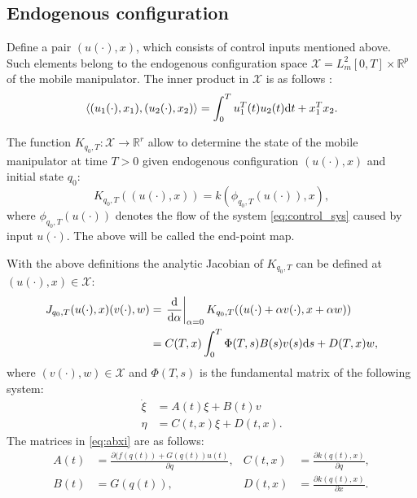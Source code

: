 \subsection{Endogenous configuration}
Define a pair $(u(\cdot), x)$, which consists of control inputs mentioned above.
Such elements belong to the endogenous configuration space
$\mathcal{X} = L_m^2[0, T] \times \mathbb{R}^p$ of the mobile manipulator.
The inner product in $\mathcal{X}$ is as follows \cite{ecs_ijc}:
\begin{equation}
\langle (u_1(\cdot), x_1), (u_2(\cdot), x_2) \rangle = \int_0^T u_1^T(t) u_2(t) \mathrm{d} t + x_1^T x_2.
\end{equation}

The function
$K_{q_0, T}: \mathcal{X} \rightarrow \mathbb{R}^r$
allow to determine the state of the mobile manipulator at time $T>0$ given
endogenous configuration $(u(\cdot), x)$ and initial state $q_0$:
\begin{equation}
K_{q_0, T}((u(\cdot), x)) = k(\phi_{q_0, T}(u(\cdot)), x),
\end{equation}
where $\phi_{q_0, T}(u(\cdot))$ denotes the flow of the system \eqref{eq:control_sys}
caused by input $u(\cdot)$. The above will be called the end-point map.

With the above definitions the analytic Jacobian of $K_{q_0, T}$ can be defined at $(u(\cdot), x) \in \mathcal{X}$:
\begin{align}
\label{eq:jacobian}
J_{q_0, T}(u(\cdot), x)(v(\cdot), w) &= \left.\frac{\mathrm{d}}{\mathrm{d} \alpha}\right|_{\alpha=0} K_{q_0, T}((u(\cdot)+\alpha v(\cdot), x+\alpha w))\\
 &= 
 C(T,x)\int_0^T \Phi(T,s)B(s)v(s)\mathrm{d} s + D(T,x)w  ,
\end{align}
where $(v(\cdot), w)\in \mathcal{X}$ and $\Phi(T,s)$ is the fundamental matrix of the following system:
\begin{equation}
\begin{aligned}
\label{eq:abxi}
\dot \xi &= A(t)\xi + B(t) v \\
\eta &= C(t, x)\xi + D(t, x).
\end{aligned}
\end{equation}
The matrices in \eqref{eq:abxi} are as follows:
\begin{equation}
\begin{aligned}
A(t) &= \frac{\partial (f(q(t))+G(q(t))u(t)}{\partial q}, & C(t, x) &= \frac{\partial k(q(t), x)}{\partial q},\\
B(t) &= G(q(t)), & D(t, x) &= \frac{\partial k(q(t), x)}{\partial x}.
\end{aligned}
\end{equation}

